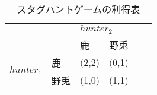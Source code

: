 \begin{table*}[htbp]
  \centering
  \begin{tabular}{|l|l|l|l|l|l|}
  \hline
  \multicolumn{2}{|l|}{\multirow{2}{*}{}} & \multicolumn{2}{l|}{$hunter_2$} \\ \cline{3-4}
  \multicolumn{2}{|l|}{                 } & 鹿 & 野兎 \\ \hline
  \multirow{2}{*}{$hunter_1$}
  & 鹿 &(2,2)&(0,1)\\ \cline{2-4}
  & 野兎 &(1,0)&(1,1)\\ \hline
  \end{tabular}
  \caption{スタグハントゲームの利得表}
  \label{stag-hunt-game}
\end{table*}